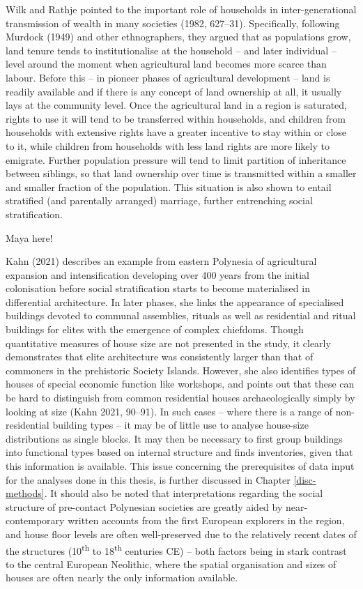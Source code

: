 \documentclass[
  12pt,
  a4paper, twoside]{book}
\begin{document}
Wilk and Rathje pointed to the important role of households in inter-generational transmission of wealth in many societies (1982, 627--31). Specifically, following Murdock (1949) and other ethnographers, they argued that as populations grow, land tenure tends to institutionalise at the household -- and later individual -- level around the moment when agricultural land becomes more scarce than labour. Before this -- in pioneer phases of agricultural development -- land is readily available and if there is any concept of land ownership at all, it usually lays at the community level. Once the agricultural land in a region is saturated, rights to use it will tend to be transferred within households, and children from households with extensive rights have a greater incentive to stay within or close to it, while children from households with less land rights are more likely to emigrate. Further population pressure will tend to limit partition of inheritance between siblings, so that land ownership over time is transmitted within a smaller and smaller fraction of the population. This situation is also shown to entail stratified (and parentally arranged) marriage, further entrenching social stratification.

Maya here!

Kahn (2021) describes an example from eastern Polynesia of agricultural expansion and intensification developing over 400 years from the initial colonisation before social stratification starts to become materialised in differential architecture. In later phases, she links the appearance of specialised buildings devoted to communal assemblies, rituals as well as residential and ritual buildings for elites with the emergence of complex chiefdoms. Though quantitative measures of house size are not presented in the study, it clearly demonstrates that elite architecture was consistently larger than that of commoners in the prehistoric Society Islands. However, she also identifies types of houses of special economic function like workshops, and points out that these can be hard to distinguish from common residential houses archaeologically simply by looking at size (Kahn 2021, 90--91). In such cases -- where there is a range of non-residential building types -- it may be of little use to analyse house-size distributions as single blocks. It may then be necessary to first group buildings into functional types based on internal structure and finds inventories, given that this information is available. This issue concerning the prerequisites of data input for the analyses done in this thesis, is further discussed in Chapter \ref{disc-methods}. It should also be noted that interpretations regarding the social structure of pre-contact Polynesian societies are greatly aided by near-contemporary written accounts from the first European explorers in the region, and house floor levels are often well-preserved due to the relatively recent dates of the structures (10\textsuperscript{th} to 18\textsuperscript{th} centuries CE) -- both factors being in stark contrast to the central European Neolithic, where the spatial organisation and sizes of houses are often nearly the only information available.
\end{document}
